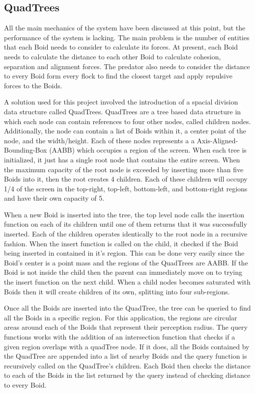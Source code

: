 \documentclass{egpubl}
\begin{document}
\subsection{QuadTrees}
\label{qtree}
All the main mechanics of the system have been discussed at this point, but the performance of the system is lacking. The main problem is the number of entities that each Boid needs to consider to calculate its forces.  At present, each Boid needs to calculate the distance to each other Boid to calculate cohesion, separation and alignment forces. The predator also needs to consider the distance to every Boid form every flock to find the closest target and apply repulsive forces to the Boids.
\par
A solution used for this project involved the introduction of a spacial division data structure called QuadTrees. QuadTrees are a tree based data structure in which each node can contain references to four other nodes, called children nodes. Additionally, the node can contain a list of Boids within it, a center point of the node, and the width/height. Each of these nodes represents a a Axis-Aligned-Bounding-Box (AABB) which occupies a region of the screen. When each tree is initialized, it just has a single root node that contains the entire screen. When the maximum capacity of the root node is exceeded by inserting more than five Boids into it, then the root creates 4 children. Each of these children will occupy 1/4 of the screen in the top-right, top-left, bottom-left, and bottom-right regions and have their own capacity of 5.
\par
When a new Boid is inserted into the tree, the top level node calls the insertion function on each of its children until one of them returns that it was successfully inserted. Each of the children operates identically to the root node in a recursive fashion. When the insert function is called on the child, it checked if the Boid being inserted in contained in it's region. This can be done very easily since the Boid's center is a point mass and the regions of the QuadTrees are AABB. If the Boid is not inside the child then the parent can immediately move on to trying the insert function on the next child. When a child nodes becomes saturated with Boids then it will create children of its own, splitting into four sub-regions.
\par
Once all the Boids are inserted into the QuadTree, the tree can be queried to find all the Boids in a specific region. For this application, the regions are circular areas around each of the Boids that represent their perception radius. The query functions works with the addition of an intersection function that checks if a given region overlaps with a quadTree node. If it does, all the Boids contained by the QuadTree are appended into a list of nearby Boids and the query function is recursively called on the QuadTree's children. Each Boid then checks the distance to each of the Boids in the list returned by the query instead of checking distance to every Boid.
\end{document}
